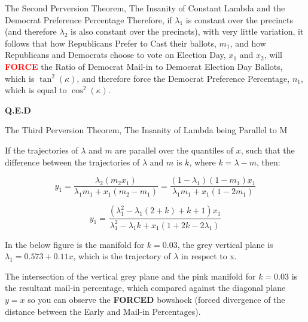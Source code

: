 \begin{theorem}{The Second Perversion Theorem, The Insanity of Constant Lambda and the Democrat Preference Percentage}
Therefore, if $\lambda_{1}$ is constant over the precincts (and therefore $\lambda_{2}$ is also constant over the precincts), with very little variation, it follows that how Republicans Prefer to Cast their ballots, $m_{1}$, and how Republicans and Democrats choose to vote on Election Day, $x_{1}$ and $x_{2}$, will \textbf{\textcolor{red}{FORCE}} the Ratio of Democrat Mail-in to Democrat Election Day Ballots, which is $\tan^{2}(\kappa)$, and therefore force the Democrat Preference Percentage, $n_{1}$, which is equal to $\cos^{2}(\kappa)$.
\begin{flushright}
\textbf{Q.E.D}
\end{flushright}
\end{theorem}
\newpage
\begin{theorem}{The Third Perversion Theorem, The Insanity of Lambda being Parallel to M}

If the trajectories of $\lambda$ and $m$ are parallel over the quantiles of $x$, such that the difference between the trajectories of $\lambda$ and $m$ is $k$, where $k=\lambda-m$, then:

$$y_{1}=\frac{\lambda_{2}(m_{2}x_{1})}{\lambda_{1}m_{1}+x_{1}(m_{2}-m_{1})}=\frac{(1-\lambda_{1})(1-m_{1})x_{1}}{\lambda_{1}m_{1}+x_{1}(1-2m_{1})}$$

$$y_{1}=\frac{(\lambda_{1}^2-\lambda_{1}(2+k)+k+1)x_{1}}{\lambda_{1}^2-\lambda_{1}k+x_{1}(1+2k-2\lambda_{1})}$$
\end{theorem}
In the below figure is the manifold for $k=0.03$, the grey vertical plane is $\lambda_{1}=0.573+0.11x$, which is the trajectory of $\lambda$ in respect to x. 

The intersection of the vertical grey plane and the pink manifold for $k=0.03$ is the resultant mail-in percentage, which compared against the diagonal plane $y=x$ so you can observe the \textbf{FORCED} bowshock (forced divergence of the distance between the Early and Mail-in Percentages). 

